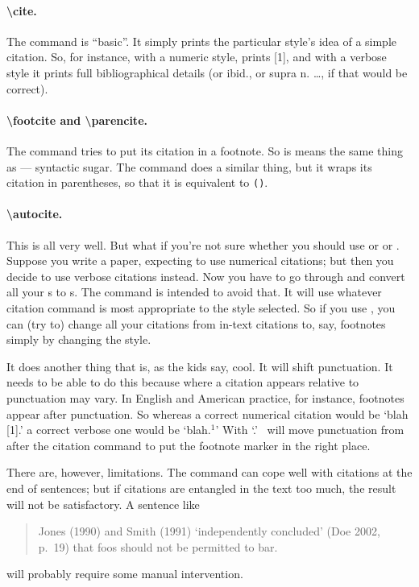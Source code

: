 \paragraph{\textbackslash cite.} The  command is “basic”. It
simply prints the particular style’s idea of a simple citation. So,
for instance, with a numeric style,  prints [1], and with a
verbose style it prints full bibliographical details (or ibid., or
supra n. \ldots, if that would be correct).


\paragraph{\textbackslash footcite and \textbackslash parencite.} The
 command tries to put its citation in a footnote. So
 is means the same thing as  --- syntactic sugar. The  command
does a similar thing, but it wraps its citation in parentheses, so
that it is equivalent to \texttt{()}.


\paragraph{\textbackslash autocite.} This is all very well. But what
if you’re not sure whether you should use  or 
or . Suppose you write a paper, expecting to use
numerical citations; but then you decide to use verbose citations
instead. Now you have to go through and convert all your s to
s. The  command is intended to avoid
that. It will use whatever citation command is most appropriate to the
style selected. So if you use , you can (try to) change
all your citations from in-text citations to, say, footnotes simply by
changing the style.

It does another thing that is, as the kids say, cool. It will shift
punctuation. It needs to be able to do this because where a citation
appears relative to punctuation may vary. In English and American
practice, for instance, footnotes appear after punctuation. So whereas
a correct numerical citation would be `blah [1].' a correct verbose one
would be `blah.$^1$' With `.' \biblatex\ will move
punctuation from after the citation command to put the footnote marker
in the right place.

There are, however, limitations. The  command can cope
well with citations at the end of sentences; but if citations are
entangled in the text too much, the result will not be satisfactory. A
sentence like
\begin{quote}
  Jones (1990) and Smith (1991) `independently concluded' (Doe 2002,
  p.~19) that foos should not be permitted to bar.
\end{quote}
will probably require some manual intervention.

